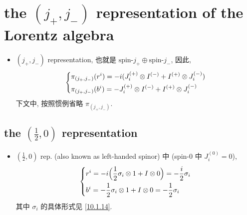 \section{the \texorpdfstring{$(j_+, j_-)$}{(j+, j-)} representation of the Lorentz algebra}
\begin{itemize}
	\item $(j_+, j_-)$ representation, 也就是 $\text{spin-} j_+ \oplus \text{spin-} j_-$, 因此,
	\begin{equation}
		\begin{dcases}
			\pi_{(j_+, j_-)}(r^i) = - i (J^{(+)}_i \otimes I^{(-)} + I^{(+)} \otimes J^{(-)}_i) \\
			\pi_{(j_+, j_-)}(b^i) = - J^{(+)}_i \otimes I^{(-)} + I^{(+)} \otimes J^{(-)}_i
		\end{dcases}
	\end{equation}
	下文中, 按照惯例省略 $\pi_{(j_+, j_-)}$.
\end{itemize}

\subsection{the \texorpdfstring{$(\frac{1}{2}, 0)$}{(1/2, 0)} representation}
\begin{itemize}
	\item $(\frac{1}{2}, 0)$ rep. (also known as left-handed spinor) 中 (spin-$0$ 中 $J^{(0)}_i = 0$),
	\begin{equation}
		\begin{dcases}
			r^i = - i \Big( \frac{1}{2} \sigma_i \otimes 1 + I \otimes 0 \Big) = - \frac{i}{2} \sigma_i \\
			b^i = - \frac{1}{2} \sigma_i \otimes 1 + I \otimes 0 = - \frac{1}{2} \sigma_i
		\end{dcases}
	\end{equation}
	其中 $\sigma_i$ 的具体形式见 \eqref{10.1.14}.
\end{itemize}

